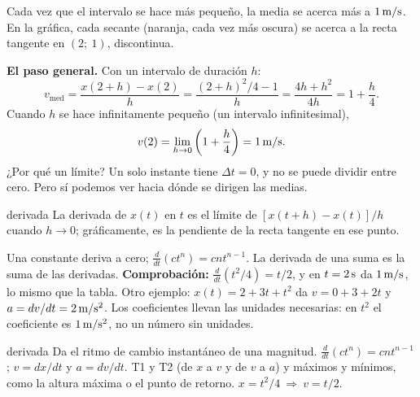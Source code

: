 \documentclass[11pt,a4paper]{article}
\begin{document}
\smallskip
Cada vez que el intervalo se hace m\'as peque\~no, la media se acerca m\'as a
$1\,\mathrm{m/s}$. En la gr\'afica, cada secante (naranja, cada vez m\'as oscura) se acerca a la
recta tangente en $(2;\ 1)$, discontinua.

\textbf{El paso general.} Con un intervalo de duraci\'on $h$:
\[
v_{\mathrm{med}}=\frac{x(2+h)-x(2)}{h}=\frac{(2+h)^2/4-1}{h}=\frac{4h+h^2}{4h}=1+\frac h4 .
\]
Cuando $h$ se hace infinitamente peque\~no (un intervalo infinitesimal),
\[
v(2)=\lim_{h\to0}\left(1+\frac h4\right)=1\,\mathrm{m/s}.
\]
¿Por qu\'e un l\'imite? Un solo instante tiene $\Delta t=0$, y no se puede dividir
entre cero. Pero s\'i podemos ver hacia d\'onde se dirigen las medias.

\begin{defbox}{derivada}
La derivada de $x(t)$ en $t$ es el l\'imite de $[x(t+h)-x(t)]/h$ cuando $h\to0$;
gr\'aficamente, es la pendiente de la recta tangente en ese punto.
\end{defbox}

Una constante deriva a cero; $\frac{d}{dt}(ct^n)=cnt^{n-1}$.
La derivada de una suma es la suma de las derivadas.
\textbf{Comprobaci\'on:} $\frac{d}{dt}(t^2/4)=t/2$, y en $t=2\,\mathrm{s}$ da
$1\,\mathrm{m/s}$, lo mismo que la tabla.
Otro ejemplo: $x(t)=2+3t+t^2$ da $v=0+3+2t$ y $a=dv/dt=2\,\mathrm{m/s^2}$.
Los coeficientes llevan las unidades necesarias: en $t^2$ el coeficiente es
$1\,\mathrm{m/s^2}$, no un n\'umero sin unidades.

\begin{toolbox}{derivada}
 Da el ritmo de cambio instant\'aneo de una magnitud.
 $\frac{d}{dt}(ct^n)=cnt^{n-1}$; $v=dx/dt$ y $a=dv/dt$.
 T1 y T2 (de $x$ a $v$ y de $v$ a $a$) y m\'aximos y m\'inimos,
como la altura m\'axima o el punto de retorno.
 $x=t^2/4\ \Rightarrow\ v=t/2$.
\end{toolbox}
\end{document}
